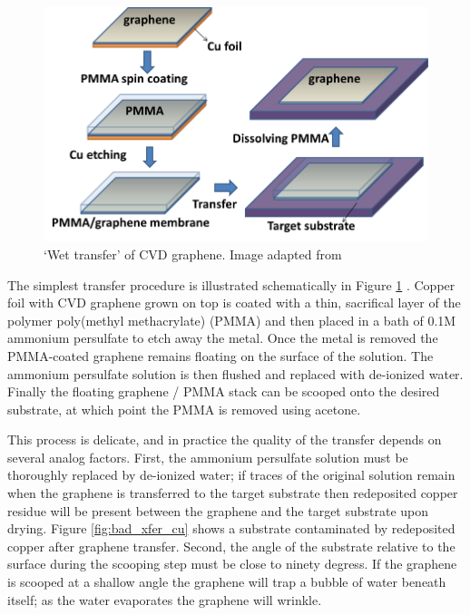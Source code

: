 \documentclass[edeposit,fullpage,draftthesis]{uiucthesis2009}
\begin{document}
        \begin{figure}
            \centering
            \includegraphics[width=0.8\linewidth]{images/experimentaltechniques/wettransfer.png}
            \caption[Wet transfer of CVD graphene]{
                `Wet transfer' of CVD graphene.
                Image adapted from \cite{kumar2013synthesis}}
            \label{fig:wettransfer}
        \end{figure}

        The simplest transfer procedure is illustrated schematically in Figure \ref{fig:wettransfer} \cite{reina2008large, kim2009large, li2009large}.
        Copper foil with CVD graphene grown on top is coated with a thin, sacrifical layer of the 
        polymer poly(methyl methacrylate) (PMMA) and then placed in a bath of 0.1M ammonium persulfate
        to etch away the metal. Once the metal is removed the PMMA-coated graphene 
        remains floating on the surface of the solution. The ammonium persulfate solution is then flushed and replaced
        with de-ionized water.
        Finally the floating graphene / PMMA stack can be
        scooped onto the desired substrate, at which point the PMMA is removed using acetone.
        
        This process is delicate, and in practice the quality of the transfer depends on several 
        analog factors. First, the ammonium persulfate solution must be thoroughly replaced by de-ionized water;
        if traces of the original solution remain when the graphene is transferred to the target substrate
        then redeposited copper residue will be present between the graphene and the target substrate upon drying. 
        Figure \ref{fig:bad_xfer_cu} shows a substrate contaminated by redeposited copper after graphene transfer.
        Second, the angle of the substrate relative to the surface during the scooping step must be close
        to ninety degress. If the graphene is scooped at a shallow angle the graphene will trap a bubble of water
        beneath itself; as the water evaporates the graphene will wrinkle.
        
\end{document}
